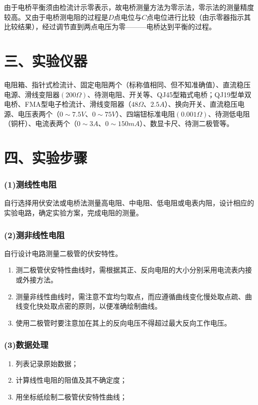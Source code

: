 \documentclass[11pt,a4paper,oneside]{article}
\begin{document}
由于电桥平衡须由检流计示零表示，故电桥测量方法为零示法，零示法的测量精度较高。又由于电桥测电阻的过程是$D$点电位与$C$点电位进行比较（由示零器指示其比较结果），经过调节直到两点电压为零———电桥达到平衡的过程。

\section*{三、实验仪器}
电阻箱、指针式检流计、固定电阻两个（标称值相同、但不知准确值）、直流稳压电源、滑线变阻器$(200\Omega )$、待测电阻、开关等、QJ45型箱式电桥；QJ19型单双电桥、FMA型电子检流计、滑线变阻器（$48\Omega $、$2.5A$）、换向开关、直流稳压电源、电压表两个（$0\sim 7.5V$、$0\sim 75V$）、四端钮标准电阻$(0.001\Omega )$、待测低电阻（铜杆）、电流表两个（$0\sim 3A$、$0\sim 150mA$）、数显卡尺、待测二极管等。

\section*{四、实验步骤}
\subsubsection*{(1)测线性电阻}
自行选择用伏安法或电桥法测量高电阻、中电阻、低电阻或电表内阻，设计相应的实验电路，确定实验方案，完成电阻的测量。
\subsubsection*{(2)测非线性电阻}
自行设计电路测量二极管的伏安特性。
\begin{enumerate}
\item 测二极管伏安特性曲线时，需根据其正、反向电阻的大小分别采用电流表内接或外接方法。
\item 测量非线性曲线时，需注意不宜均匀取点，而应遵循曲线变化慢处取点疏、曲线变化快处取点密的原则，以便准确绘制曲线。
\item 使用二极管时要注意加在其上的反向电压不得超过最大反向工作电压。
\end{enumerate}
\subsubsection*{(3)数据处理}
\begin{enumerate}
\item 列表记录原始数据；
\item 计算线性电阻的阻值及其不确定度；
\item 用坐标纸绘制二极管伏安特性曲线；
\end{enumerate}
\end{document}
